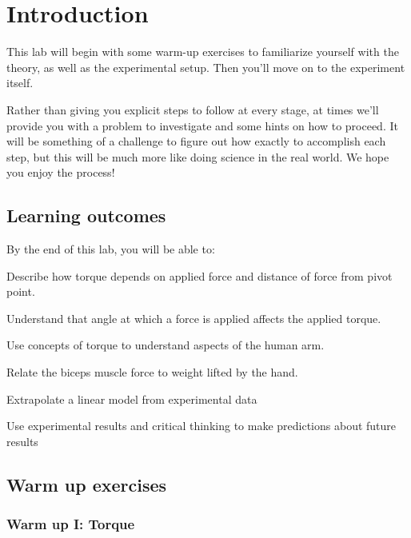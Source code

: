 \section*{Introduction}

This lab will begin with some warm-up exercises to familiarize yourself 
with the theory, as well as the experimental setup.
Then you'll move on to the experiment itself.

Rather than giving you explicit steps to follow at every stage,
at times we'll provide you with a problem to investigate
and some hints on how to proceed.  
It will be something of a challenge to figure out how exactly to accomplish
each step, but this will be much more like doing science in the real world.
We hope you enjoy the process!

\subsection*{Learning outcomes}
By the end of this lab, you will be able to:
\enumb[label=\roman*.]
\item Describe how torque depends on applied force and distance 
of force from pivot point.
\item Understand that angle at which a force is applied 
	affects the applied torque.
\item Use concepts of torque to understand aspects of the human arm.
\item Relate the biceps muscle force to weight lifted by the hand.
\item Extrapolate a linear model from experimental data
\item Use experimental results and critical thinking
	to make predictions about future results
\enume

\pagebreak

\subsection*{Warm up exercises}

\subsubsection*{Warm up I:  Torque}

